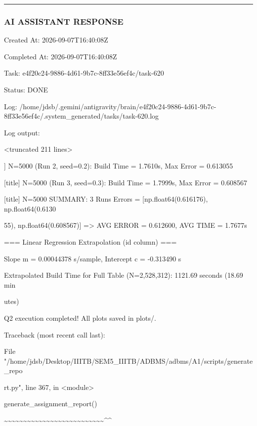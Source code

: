 \documentclass[11pt,a4paper]{article}
\begin{document}
\hrule

\subsubsection{AI ASSISTANT RESPONSE}

Created At: 2026-09-07T16:40:08Z

Completed At: 2026-09-07T16:40:08Z

Task: e4f20c24-9886-4d61-9b7c-8ff33e56ef4c/task-620

Status: DONE

Log: /home/jdsb/.gemini/antigravity/brain/e4f20c24-9886-4d61-9b7c-8ff33e56ef4c/.system\_generated/tasks/task-620.log

Log output:

<truncated 211 lines>

] N=5000 (Run 2, seed=0.2): Build Time = 1.7610s, Max Error = 0.613055

[title] N=5000 (Run 3, seed=0.3): Build Time = 1.7999s, Max Error = 0.608567

[title] N=5000 SUMMARY: 3 Runs Errors = [np.float64(0.616176), np.float64(0.6130

55), np.float64(0.608567)] => AVG ERROR = 0.612600, AVG TIME = 1.7677s


=== Linear Regression Extrapolation (id column) ===

Slope m = 0.00044378 s/sample, Intercept c = -0.313490 s

Extrapolated Build Time for Full Table (N=2,528,312): 1121.69 seconds (18.69 min

utes)

Q2 execution completed! All plots saved in plots/.

Traceback (most recent call last):

File "/home/jdsb/Desktop/IIITB/SEM5\_IIITB/ADBMS/adbms/A1/scripts/generate\_repo

rt.py", line 367, in <module>

generate\_assignment\_report()

\textasciitilde{}\textasciitilde{}\textasciitilde{}\textasciitilde{}\textasciitilde{}\textasciitilde{}\textasciitilde{}\textasciitilde{}\textasciitilde{}\textasciitilde{}\textasciitilde{}\textasciitilde{}\textasciitilde{}\textasciitilde{}\textasciitilde{}\textasciitilde{}\textasciitilde{}\textasciitilde{}\textasciitilde{}\textasciitilde{}\textasciitilde{}\textasciitilde{}\textasciitilde{}\textasciitilde{}\textasciitilde{}\textasciitilde{}\textasciicircum{}\textasciicircum{}
\end{document}
